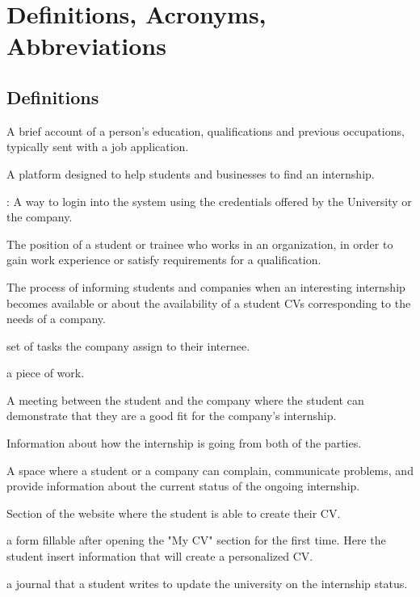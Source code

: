 \section{Definitions, Acronyms, Abbreviations}


\subsection{Definitions}
\begin{description}[leftmargin=0pt]
\item[Curriculum Vitae (CV):] A brief account of a person's education, qualifications and previous occupations, typically sent with a job application.
\item[Students\&Companies:] A platform designed to help students and businesses to find an internship.
\item[Single Sign On (SSO)]: A way to login into the system using the credentials offered by the University or the company. 
\item[Internship:] The position of a student or trainee who works in an organization, in order to gain work experience or satisfy requirements for a qualification.
\item[Recommendation:] The process of informing students and companies when an interesting internship becomes available or about the availability of a student CVs corresponding to the needs of a company.
\item[Project:] set of tasks the company assign to their internee.
\item[Task:] a piece of work.
\item[Interviews:] A meeting between the student and the company where the student can demonstrate that they are a good fit for the company's internship. 
\item[Feedback:] Information about how the internship is going from both of the parties.
\item [Report Area:] A space where a student or a company can complain, communicate problems, and provide information about the current status of the ongoing internship.
\item[My CV:] Section of the website where the student is able to create their CV.
\item[InitialForm:] a form fillable after opening the "My CV" section for the first time. Here the student insert information that will create a personalized CV.
\item[Logbook:] a journal that a student writes to update the university on the internship status.

\end{description}


